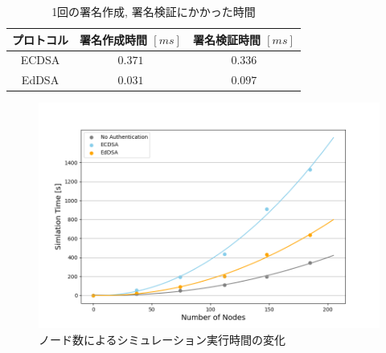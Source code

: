 \begin{longtable}{c|cc}
  \caption{1回の署名作成, 署名検証にかかった時間}
  \label{tab:exp3_sigtime} \\
  \endfirsthead
  \hline
  プロトコル & 署名作成時間 $[ms]$ & 署名検証時間 $[ms]$ \\ \hline
  ECDSA & $0.371$ & $0.336$ \\
  EdDSA & $0.031$ & $0.097$ \\ \hline
\end{longtable}
\clearpage
\begin{figure}
  \centering
  \includegraphics[width=1\textwidth]{figures/exp3_simtime.png}
  \caption{ノード数によるシミュレーション実行時間の変化}
  \label{fig:exp3_simtime}
\end{figure}
\setlength{\tabcolsep}{4pt}
